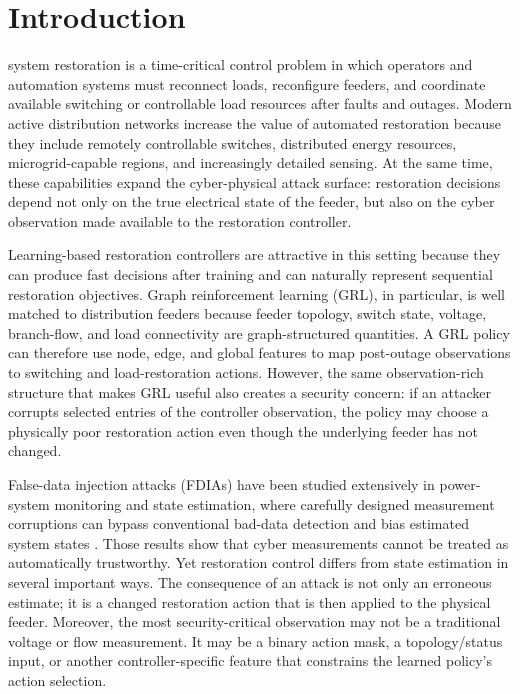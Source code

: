 % 

\section{Introduction}
 system restoration is a time-critical control problem in which operators and automation systems must reconnect loads, reconfigure feeders, and coordinate available switching or controllable load resources after faults and outages. Modern active distribution networks increase the value of automated restoration because they include remotely controllable switches, distributed energy resources, microgrid-capable regions, and increasingly detailed sensing. At the same time, these capabilities expand the cyber-physical attack surface: restoration decisions depend not only on the true electrical state of the feeder, but also on the cyber observation made available to the restoration controller.

Learning-based restoration controllers are attractive in this setting because they can produce fast decisions after training and can naturally represent sequential restoration objectives. Graph reinforcement learning (GRL), in particular, is well matched to distribution feeders because feeder topology, switch state, voltage, branch-flow, and load connectivity are graph-structured quantities. A GRL policy can therefore use node, edge, and global features to map post-outage observations to switching and load-restoration actions. However, the same observation-rich structure that makes GRL useful also creates a security concern: if an attacker corrupts selected entries of the controller observation, the policy may choose a physically poor restoration action even though the underlying feeder has not changed.

False-data injection attacks (FDIAs) have been studied extensively in power-system monitoring and state estimation, where carefully designed measurement corruptions can bypass conventional bad-data detection and bias estimated system states \cite{liu2009false,kosut2011malicious,xie2011false,bi2014graphical}. Those results show that cyber measurements cannot be treated as automatically trustworthy. Yet restoration control differs from state estimation in several important ways. The consequence of an attack is not only an erroneous estimate; it is a changed restoration action that is then applied to the physical feeder. Moreover, the most security-critical observation may not be a traditional voltage or flow measurement. It may be a binary action mask, a topology/status input, or another controller-specific feature that constrains the learned policy's action selection.

